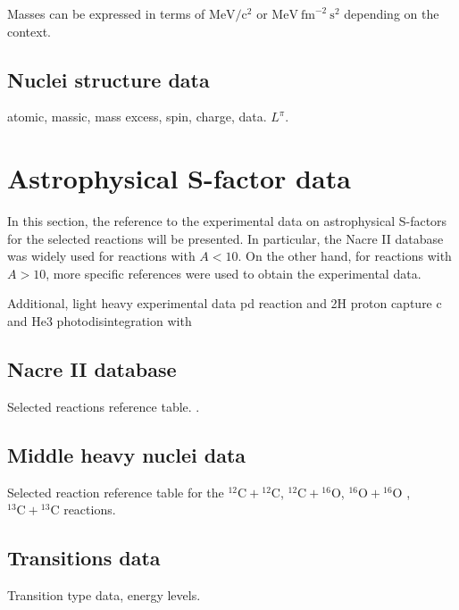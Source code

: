 \documentclass[openany]{book}
\begin{document}
Masses can be expressed in terms of $\mathrm{MeV/c^2}$ or $\mathrm{MeV \ {fm}^{-2} \ s^{2}}$ depending on the context.  

\subsection{Nuclei structure data}

atomic, massic, mass excess, spin, charge, data. $L^{\pi}$.

\section{Astrophysical S-factor data} \label{sec:sfactorData}

In this section, the reference to the experimental data on astrophysical S-factors for the selected reactions will be presented. In particular, the Nacre II database was widely used for reactions with $A < 10$. On the other hand, for reactions with $A > 10$, more specific references were used to obtain the experimental data.

Additional, light heavy experimental data pd reaction \cite{bystritsky_gerasimov_krylov_parzhitskii_dudkin_kaminskii_nechaev_padalko_petrov_mesyats_et_2008} and 2H proton capture c\cite{schmid_chasteler_laymon_weller_prior_tilley_1995} and He3 photodisintegration \cite{berman_koester_smith_1964} with \cite{warren_erdman_robertson_axen_macdonald_1963}

\subsection{Nacre II database}

Selected reactions reference table.  \cite{xu_takahashi_goriely_arnould_ohta_utsunomiya_2013}.


\subsection{Middle heavy nuclei data}

Selected reaction reference table for the $\mathrm{{}^{12}C + {}^{12}C}$, $\mathrm{{}^{12}C + {}^{16}O}$,  $\mathrm{{}^{16}O + {}^{16}O}$ ,  $\mathrm{{}^{13}C + {}^{13}C}$ reactions. 

\subsection{Transitions data}

Transition type data, energy levels. 
\end{document}
